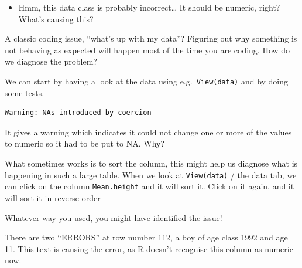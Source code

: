 \documentclass[
  letterpaper,
  DIV=11,
  numbers=noendperiod]{scrreprt}
\newenvironment{Shaded}{}{}
\newcommand{\CommentTok}[1]{\textcolor[rgb]{0.42,0.45,0.49}{#1}}
\newcommand{\FunctionTok}[1]{\textcolor[rgb]{0.44,0.26,0.76}{#1}}
\newcommand{\NormalTok}[1]{\textcolor[rgb]{0.14,0.16,0.18}{#1}}
\newcommand{\OtherTok}[1]{\textcolor[rgb]{0.44,0.26,0.76}{#1}}
\newcommand{\SpecialCharTok}[1]{\textcolor[rgb]{0.00,0.36,0.77}{#1}}
\providecommand{\tightlist}{%
  \setlength{\itemsep}{0pt}\setlength{\parskip}{0pt}}\usepackage{longtable,booktabs,array}
\begin{document}
\begin{itemize}
\tightlist
\item
  Hmm, this data class is probably incorrect\ldots{} It should be
  numeric, right? What's causing this?
\end{itemize}

\begin{tcolorbox}[enhanced jigsaw, arc=.35mm, left=2mm, titlerule=0mm, rightrule=.15mm, colframe=quarto-callout-tip-color-frame, coltitle=black, colback=white, opacityback=0, bottomtitle=1mm, bottomrule=.15mm, colbacktitle=quarto-callout-tip-color!10!white, breakable, title=\textcolor{quarto-callout-tip-color}{\faLightbulb}\hspace{0.5em}{Code and answer}, toptitle=1mm, toprule=.15mm, opacitybacktitle=0.6, leftrule=.75mm]

A classic coding issue, ``what's up with my data''? Figuring out why
something is not behaving as expected will happen most of the time you
are coding. How do we diagnose the problem?

We can start by having a look at the data using e.g.~\texttt{View(data)}
and by doing some tests.

\begin{Shaded}
\end{Shaded}

\begin{verbatim}
Warning: NAs introduced by coercion
\end{verbatim}

It gives a warning which indicates it could not change one or more of
the values to numeric so it had to be put to NA. Why?

What sometimes works is to sort the column, this might help us diagnose
what is happening in such a large table. When we look at
\texttt{View(data)} / the data tab, we can click on the column
\texttt{Mean.height} and it will sort it. Click on it again, and it will
sort it in reverse order

Whatever way you used, you might have identified the issue!

There are two ``ERRORS'' at row number 112, a boy of age class 1992 and
age 11. This text is causing the error, as R doesn't recognise this
column as numeric now.

\end{tcolorbox}
\end{document}
